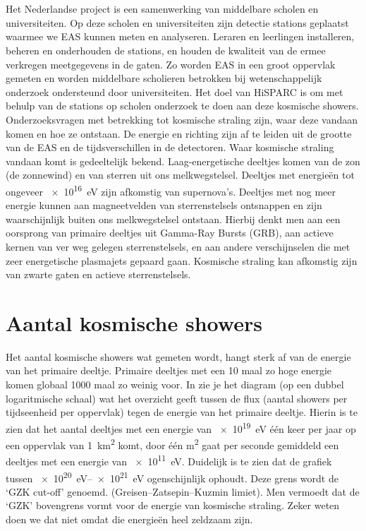 \section{\hisparc}

Het Nederlandse project \hisparc is een samenwerking van middelbare scholen en universiteiten.
Op deze scholen en universiteiten zijn detectie stations geplaatst waarmee we EAS kunnen 
meten en analyseren. Leraren en leerlingen installeren, beheren en onderhouden de stations,
en houden de kwaliteit van de ermee verkregen meetgegevens in de gaten.
Zo worden EAS in een groot oppervlak gemeten en worden middelbare
scholieren betrokken bij wetenschappelijk onderzoek ondersteund door
universiteiten. Het doel van HiSPARC is om met behulp van de stations op
scholen onderzoek te doen aan deze kosmische showers. Onderzoeksvragen
met betrekking tot kosmische straling zijn, waar deze vandaan komen en
hoe ze ontstaan. De energie en richting zijn af te leiden uit de grootte
van de EAS en de tijdsverschillen in de detectoren. Waar kosmische
straling vandaan komt is gedeeltelijk bekend. Laag-energetische deeltjes
komen van de zon (de zonnewind) en van sterren uit ons melkwegstelsel.
Deeltjes met energieën tot ongeveer \SI{e16}{\electronvolt} zijn
afkomstig van supernova's. Deeltjes met nog meer energie kunnen aan
magneetvelden van sterrenstelsels ontsnappen en zijn waarschijnlijk
buiten ons melkwegstelsel ontstaan. Hierbij denkt men aan een oorsprong
van primaire deeltjes uit Gamma-Ray Bursts (GRB), aan actieve kernen van
ver weg gelegen sterrenstelsels, en aan andere verschijnselen die met
zeer energetische plasmajets gepaard gaan. Kosmische straling kan
afkomstig zijn van zwarte gaten en actieve sterrenstelsels.

\section{Aantal kosmische showers}

Het aantal kosmische showers wat gemeten wordt, hangt sterk af van de
energie van het primaire deeltje. Primaire deeltjes met een 10 maal zo
hoge energie komen globaal 1000 maal zo weinig voor. In
 zie je het diagram (op een dubbel
logaritmische schaal) wat het overzicht geeft tussen de flux (aantal
showers per tijdseenheid per oppervlak) tegen de energie van het
primaire deeltje. Hierin is te zien dat het aantal deeltjes met een
energie van \SI{e19}{\electronvolt} één keer per jaar op een oppervlak
van \SI{1}{\square\kilo\meter} komt, door één \si{\square\meter} gaat
per seconde gemiddeld een deeltjes met een energie van
\SI{e11}{\electronvolt}. Duidelijk is te zien dat de grafiek tussen
\SIrange{e20}{e21}{\electronvolt} ogenschijnlijk ophoudt. Deze grens
wordt de ‘GZK cut-off’ genoemd. (Greisen–Zatsepin–Kuzmin limiet). Men
vermoedt dat de ‘GZK’ bovengrens vormt voor de energie van kosmische
straling. Zeker weten doen we dat niet omdat die energieën heel zeldzaam
zijn.

